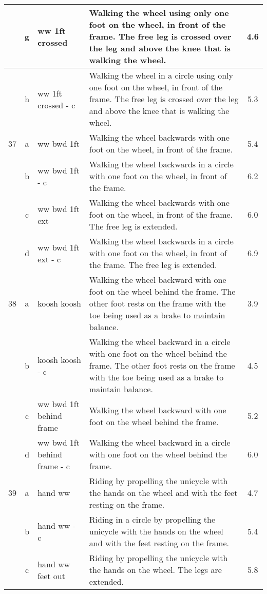 \begin{longtable}{|r|c|p{4cm}|p{8cm}|c|}
\hline
  & g & ww 1ft crossed  & Walking the wheel using only one foot on the wheel, in front of the frame. The free leg is crossed over the leg and above the knee that is walking the wheel. & 4.6 \\ 
\hline
  & h & ww 1ft crossed - c  & Walking the wheel in a circle using only one foot on the wheel, in front of the frame. The free leg is crossed over the leg and above the knee that is walking the wheel. & 5.3 \\ 
\hline
37  & a & ww bwd 1ft  & Walking the wheel backwards with one foot on the wheel, in front of the frame.  & 5.4 \\ 
\hline
  & b & ww bwd 1ft - c  & Walking the wheel backwards in a circle with one foot on the wheel, in front of the frame.  & 6.2 \\ 
\hline
  & c & ww bwd 1ft ext  & Walking the wheel backwards with one foot on the wheel, in front of the frame. The free leg is extended.  & 6.0 \\ 
\hline
  & d & ww bwd 1ft ext - c  & Walking the wheel backwards in a circle with one foot on the wheel, in front of the frame. The free leg is extended.  & 6.9 \\ 
\hline
38  & a & koosh koosh & Walking the wheel backward with one foot on the wheel behind the frame. The other foot rests on the frame with the toe being used as a brake to maintain balance. & 3.9 \\ 
\hline
  & b & koosh koosh - c & Walking the wheel backward in a circle with one foot on the wheel behind the frame. The other foot rests on the frame with the toe being used as a brake to maintain balance. & 4.5 \\ 
\hline
  & c & ww bwd 1ft behind frame & Walking the wheel backward with one foot on the wheel behind the frame. & 5.2 \\ 
\hline
  & d & ww bwd 1ft behind frame - c & Walking the wheel backward in a circle with one foot on the wheel behind the frame. & 6.0 \\ 
\hline
39  & a & hand ww & Riding by propelling the unicycle with the hands on the wheel and with the feet resting on the frame. & 4.7 \\ 
\hline
  & b & hand ww - c & Riding in a circle by propelling the unicycle with the hands on the wheel and with the feet resting on the frame. & 5.4 \\ 
\hline
  & c & hand ww feet out  & Riding by propelling the unicycle with the hands on the wheel. The legs are extended. & 5.8 \\ 

\end{longtable}
